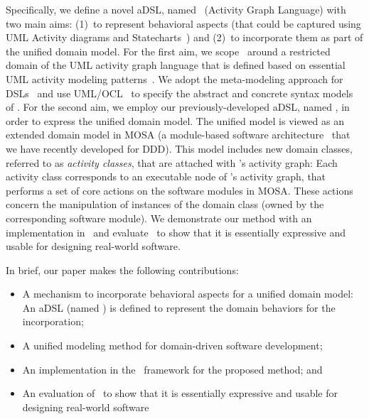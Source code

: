 Specifically, we define a novel aDSL, named \agl~(Activity Graph Language) with two main aims: (1)~to represent behavioral aspects (that could be captured using UML Activity diagrams and Statecharts~\cite{omg_unified_2017}) and (2)~to incorporate them as part of the unified domain model. %
For the first aim, we scope \agl~around a restricted domain of the UML activity graph language that is defined based on essential UML activity modeling patterns~\cite{omg_unified_2017}. We adopt the meta-modeling approach for DSLs~\cite{kleppe_software_2008} and use UML/OCL~\cite{omg_unified_2017, omg_object_2014} to specify the abstract and concrete syntax models of \agl. %
For the second aim, we employ our previously-developed aDSL, named \dcsl, in order to express the unified domain model. The unified model is viewed as an extended domain model in MOSA (a module-based software architecture~\cite{le_generative_2018} that we have recently developed for DDD). 
This model includes new domain classes, referred to as \textit{activity classes}, that are attached with \agl's activity graph: Each activity class corresponds to an executable node of \agl's activity graph, that performs a set of core actions on the software modules in MOSA. These actions concern the manipulation of instances of the domain class (owned by the corresponding software module). We demonstrate our method with an implementation in \jdomainapp~and evaluate \agl~to show that it is essentially expressive and usable for designing real-world software.

In brief, our paper makes the following contributions:
%
\begin{itemize}[leftmargin=*]
	\item A mechanism to incorporate behavioral aspects for a unified domain model: An aDSL (named \agl) is defined to represent the domain behaviors for the incorporation;
	\item A unified modeling method for domain-driven software development;
	\item An implementation in the \jdomainapp~framework for the proposed method; and
	\item An evaluation of \agl~to show that it is essentially expressive and usable for designing real-world software
\end{itemize}

